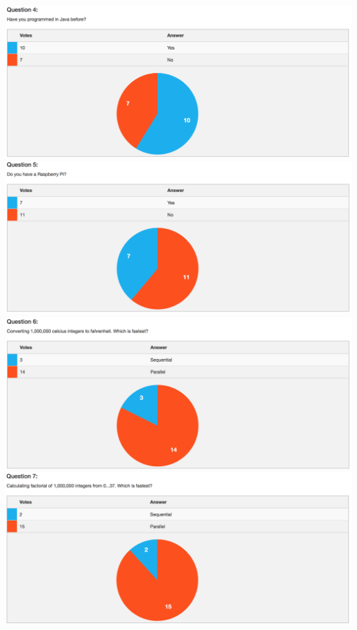 \includegraphics[width=14cm]{figures/votiee/w1q4}\\
\includegraphics[width=14cm]{figures/votiee/w1q5}\\
\includegraphics[width=14cm]{figures/votiee/w1q6}\\
\includegraphics[width=14cm]{figures/votiee/w1q7}\\
